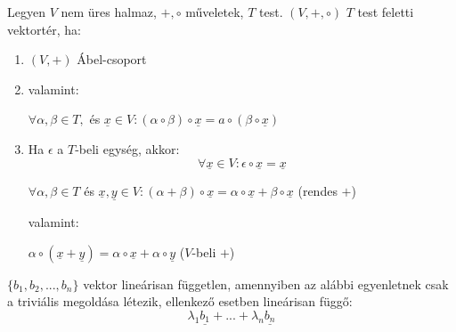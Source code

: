 \documentclass[11pt,a4paper]{article}
\begin{document}
\begin{tcolorbox}[colback=blue!5!white,colframe=blue!70!black,title= 3. Vektortér]
    Legyen \(V\) nem üres halmaz, \(+, \circ \) műveletek, \(T\) test. \((V, +, \circ)\) \(T\) test feletti vektortér, ha:
    \begin{enumerate}
        \item \((V, +)\) Ábel-csoport
        \item valamint:
        \begin{center}
        \(\forall \alpha, \beta \in T,\) és \(\underline{x} \in V : (\alpha \circ \beta) \circ \underline{x} = a\circ (\beta \circ \underline{x})\)
        \end{center}
        \item Ha \(\epsilon\)  a \(T\)-beli egység, akkor:
        $$\forall \underline{x} \in V: \epsilon \circ \underline{x} = \underline{x}$$
        \begin{center}
            \(\forall \alpha, \beta \in T \) és \(\underline{x},\underline{y} \in V: (\alpha +\beta) \circ \underline{x} = \alpha \circ \underline{x} + \beta \circ \underline{x}\) (rendes \(+\))
        \end{center}
        valamint: 
        \begin{center}
            \(\alpha \circ (\underline{x}+\underline{y}) = \alpha \circ \underline{x} + \alpha \circ \underline{y}\) (\(V\)-beli \(+\))
        \end{center}
    \end{enumerate}
\end{tcolorbox}

\begin{tcolorbox}[colback=blue!5!white,colframe=blue!70!black,title= 4. Vektorok lineáris függősége és függetlensége]
    \(\{ b_1, b_2, ..., b_n\}\) vektor lineárisan független, amennyiben az alábbi egyenletnek csak a triviális megoldása létezik, ellenkező esetben lineárisan függő:
    $$\lambda_1 \underline{b_1} +...+\lambda_n \underline{b_n}$$
\end{tcolorbox}
\end{document}
